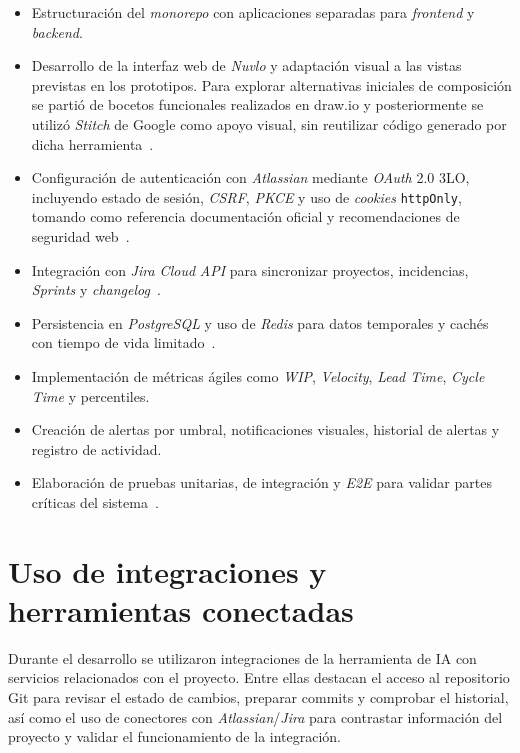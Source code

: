 \begin{refsection}
\begin{itemize}
    \item Estructuración del \textit{monorepo} con aplicaciones separadas para \textit{frontend} y \textit{backend}.
    \item Desarrollo de la interfaz web de \textit{Nuvlo} y adaptación visual a las vistas previstas en los prototipos. Para explorar alternativas iniciales de composición se partió de bocetos funcionales realizados en draw.io y posteriormente se utilizó \textit{Stitch} de Google como apoyo visual, sin reutilizar código generado por dicha herramienta~\cite{GoogleStitch}.
    \item Configuración de autenticación con \textit{Atlassian} mediante \textit{OAuth} 2.0 3LO, incluyendo estado de sesión, \textit{CSRF}, \textit{PKCE} y uso de \textit{cookies} \texttt{httpOnly}, tomando como referencia documentación oficial y recomendaciones de seguridad web~\cite{AtlassianOAuth3LO,OWASPOAuth2,OWASPCSRF}.
    \item Integración con \textit{Jira Cloud} \textit{API} para sincronizar proyectos, incidencias, \textit{Sprints} y \textit{changelog}~\cite{AtlassianJiraRestV3,AtlassianJiraIssuesApi}.
    \item Persistencia en \textit{PostgreSQL} y uso de \textit{Redis} para datos temporales y cachés con tiempo de vida limitado~\cite{PostgreSQLDocs,RedisDocs}.
    \item Implementación de métricas ágiles como \textit{WIP}, \textit{Velocity}, \textit{Lead Time}, \textit{Cycle Time} y percentiles.
    \item Creación de alertas por umbral, notificaciones visuales, historial de alertas y registro de actividad.
    \item Elaboración de pruebas unitarias, de integración y \textit{E2E} para validar partes críticas del sistema~\cite{VitestGuide,PlaywrightDocs}.
\end{itemize}

\section{Uso de integraciones y herramientas conectadas}

Durante el desarrollo se utilizaron integraciones de la herramienta de IA con servicios relacionados con el proyecto. Entre ellas destacan el acceso al repositorio Git para revisar el estado de cambios, preparar commits y comprobar el historial, así como el uso de conectores con \textit{Atlassian}/\textit{Jira} para contrastar información del proyecto y validar el funcionamiento de la integración.


\end{refsection}
